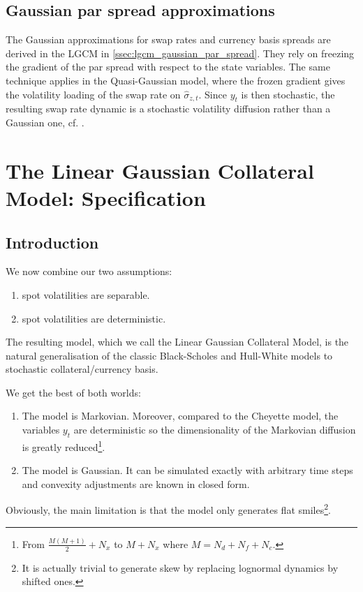 \documentclass[11pt,english]{amsart}
\theoremstyle{definition}
\begin{document}
\newpage%
\subsection{Gaussian par spread approximations}%
The Gaussian approximations for swap rates and currency basis spreads are derived in the LGCM in \autoref{ssec:lgcm_gaussian_par_spread}. They rely on freezing the gradient of the par spread with respect to the state variables. The same technique applies in the Quasi-Gaussian model, where the frozen gradient gives the volatility loading of the swap rate on $\hat{\sigma}_{z,t}$. Since $y_t$ is then stochastic, the resulting swap rate dynamic is a stochastic volatility diffusion rather than a Gaussian one, cf. \cite[\S13]{AndersenPiterbarg}.


\newpage%
\section{The Linear Gaussian Collateral Model: Specification}


\setcounter{subsection}{-1}
\subsection{Introduction}
We now combine our two assumptions:  
\begin{enumerate}
\item spot volatilities are separable. 
\item spot volatilities are deterministic. 
\end{enumerate}
The resulting model, which we call the Linear Gaussian Collateral Model, is the natural generalisation of the classic Black-Scholes and Hull-White models to stochastic collateral/currency basis.

We get the best of both worlds:
\begin{enumerate}
\item The model is Markovian. Moreover, compared to the Cheyette model, the variables $y_t$ are deterministic so the dimensionality of the Markovian diffusion is greatly reduced\footnote{From $\frac{M(M+1)}{2} +N_x$ to $M+N_x$ where $M = N_d+N_f+N_c$.}. 
\item The model is Gaussian. It can be simulated exactly with arbitrary time steps and convexity adjustments are known in closed form.
\end{enumerate}
Obviously, the main limitation is that the model only generates flat smiles\footnote{It is actually trivial to generate skew by replacing lognormal dynamics by shifted ones.}.
\end{document}
